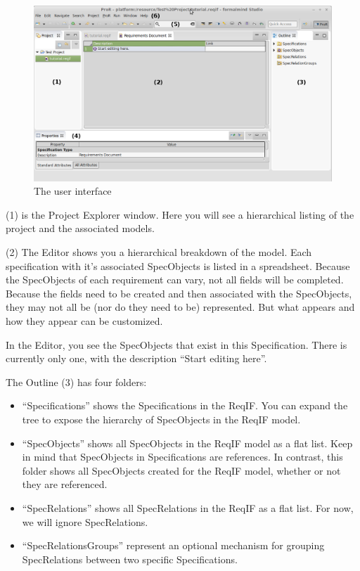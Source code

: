 \begin{figure}[h!]
  \centering
  \includegraphics[width=\linewidth]{../rmf-images/Screenshot_intro.png}
  \caption{The \pror{} user interface}
  \label{fig:user_interface_overview}
\end{figure}

(1) is the Project Explorer window.  Here you will see a hierarchical listing of the project and the associated models.

(2) The Editor shows you a hierarchical breakdown of the model.  Each specification with it's associated SpecObjects is listed in a spreadsheet.  Because the SpecObjects of each requirement can vary, not all fields will be completed.  Because the fields need to  be created and then associated with the SpecObjects, they may not all be (nor do they need to be) represented.  But what appears and how they appear can be customized.

In the Editor, you see the SpecObjects that exist in this Specification.
There is currently only one, with the description ``Start editing here''.

The Outline (3) has four folders:

\begin{itemize}

\item
  ``Specifications'' shows the Specifications in the ReqIF.  You can
  expand the tree to expose the hierarchy of SpecObjects in the
  ReqIF model.
\item
  ``SpecObjects'' shows all SpecObjects in the ReqIF model as a flat list.
  Keep in mind that SpecObjects in Specifications are references.  In
  contrast, this folder shows all SpecObjects created for the ReqIF model, whether or not they are referenced.
\item
  ``SpecRelations'' shows all SpecRelations in the ReqIF as a flat list.
  For now, we will ignore SpecRelations.
\item
  ``SpecRelationsGroups'' represent an optional mechanism for grouping SpecRelations between two specific Specifications.
\end{itemize}

